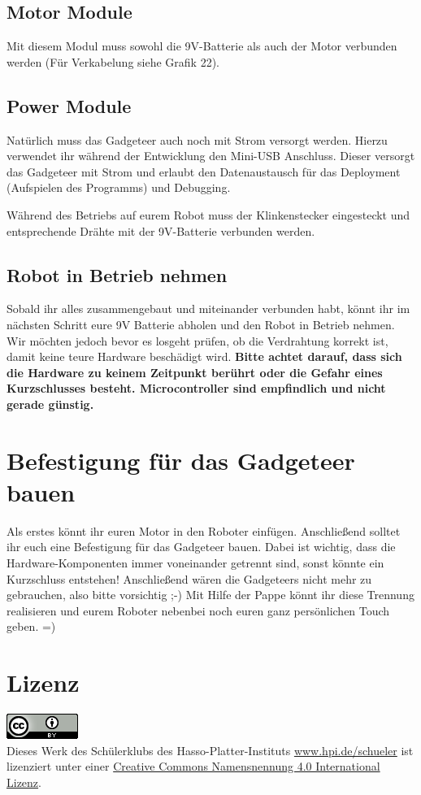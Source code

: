 \documentclass[12pt,a4paper]{article}
\begin{document}
\subsection{Motor Module}

Mit diesem Modul muss sowohl die 9V-Batterie als auch der Motor verbunden werden (Für Verkabelung siehe Grafik 22).

\subsection{Power Module}

Natürlich muss das Gadgeteer auch noch mit Strom versorgt werden. Hierzu verwendet ihr während der Entwicklung den Mini-USB Anschluss.
Dieser versorgt das Gadgeteer mit Strom und erlaubt den Datenaustausch für das Deployment (Aufspielen des Programms) und Debugging.

Während des Betriebs auf eurem Robot muss der Klinkenstecker eingesteckt und entsprechende Drähte mit der 9V-Batterie verbunden werden.

\subsection{Robot in Betrieb nehmen}

Sobald ihr alles zusammengebaut und miteinander verbunden habt, könnt ihr im nächsten Schritt eure 9V Batterie abholen und den Robot in Betrieb nehmen.
Wir möchten jedoch bevor es losgeht prüfen, ob die Verdrahtung korrekt ist, damit keine teure Hardware beschädigt wird.
\noindent\textbf{\danger Bitte achtet darauf, dass sich die Hardware zu keinem Zeitpunkt berührt oder die Gefahr eines Kurzschlusses besteht. Microcontroller sind empfindlich und nicht gerade günstig.}
\section{Befestigung für das Gadgeteer bauen}
Als erstes könnt ihr euren Motor in den Roboter einfügen. Anschließend solltet ihr euch eine Befestigung für das Gadgeteer bauen. Dabei ist wichtig, dass die Hardware-Komponenten immer voneinander getrennt sind, sonst könnte ein Kurzschluss entstehen! Anschließend wären die Gadgeteers nicht mehr zu gebrauchen, also bitte vorsichtig ;-) 
Mit Hilfe der Pappe könnt ihr diese Trennung realisieren und eurem Roboter nebenbei noch euren ganz persönlichen Touch geben. =)

\section*{Lizenz}


\href{http://creativecommons.org/licenses/by/4.0/}{\includegraphics{./CCby.png}} \\
Dieses Werk des Schülerklubs des Hasso-Platter-Instituts 
\href{http://www.hpi.de/schueler}{www.hpi.de/schueler} 
ist lizenziert unter einer 
\href{http://creativecommons.org/licenses/by/4.0/}{Creative Commons Namensnennung 4.0 International Lizenz}.
\end{document}
